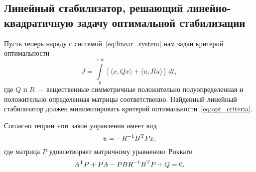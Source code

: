 \subsection{Линейный стабилизатор, решающий линейно-квадратичную задачу оптимальной стабилизации}

Пусть теперь наряду с системой~\eqref{eq:linear_system} нам задан критерий оптимальности
\begin{equation}\label{eq:opt_criteria}
	J = \int\limits_{0}^{+\infty}
	\left[
		\langle x, Qx \rangle + \langle u,Ru \rangle
	\right]\,dt,
\end{equation}
где $Q$ и $R$ --- вещественные симметричные положительно полуопределенная и положительно определенная матрицы соответственно. Найденный линейный стабилизатор должен минимизировать критерий оптимальности~\eqref{eq:opt_criteria}.

Согласно теории этот закон управления имеет вид
$$
	u = -R^{-1} B^\mathrm{T} P x,
$$
где матрица $P$ удовлетворяет матричному уравнению~Риккати
$$
	A^\mathrm{T} P  +  P A  -  P B R^{-1} B^\mathrm{T} P + Q = 0.
$$